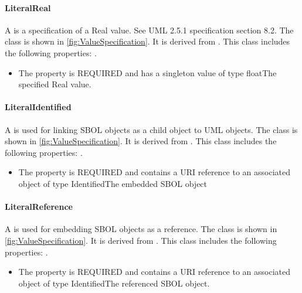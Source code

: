 \paragraph{LiteralReal}%
\label{sec:uml:LiteralReal}%
A  is a specification of a Real value. See UML 2.5.1 specification section 8.2.%
\newline%
\linebreak%
The  class is shown in \ref{fig:ValueSpecification}. It is derived from .%
This class includes the following properties: . %
\begin{itemize}%
\item%
The  property is REQUIRED and has a singleton value of type floatThe specified Real value.%
\end{itemize}%
\paragraph{LiteralIdentified}%
\label{sec:uml:LiteralIdentified}%
A  is used for linking SBOL objects as a child object to UML objects.%
\newline%
\linebreak%
The  class is shown in \ref{fig:ValueSpecification}. It is derived from .%
This class includes the following properties: . %
\begin{itemize}%
\item%
The  property is REQUIRED and contains a URI reference to an associated object of type IdentifiedThe embedded SBOL object%
\end{itemize}%
\paragraph{LiteralReference}%
\label{sec:uml:LiteralReference}%
A  is used for embedding SBOL objects as a reference.%
\newline%
\linebreak%
The  class is shown in \ref{fig:ValueSpecification}. It is derived from .%
This class includes the following properties: . %
\begin{itemize}%
\item%
The  property is REQUIRED and contains a URI reference to an associated object of type IdentifiedThe referenced SBOL object.%
\end{itemize}%
